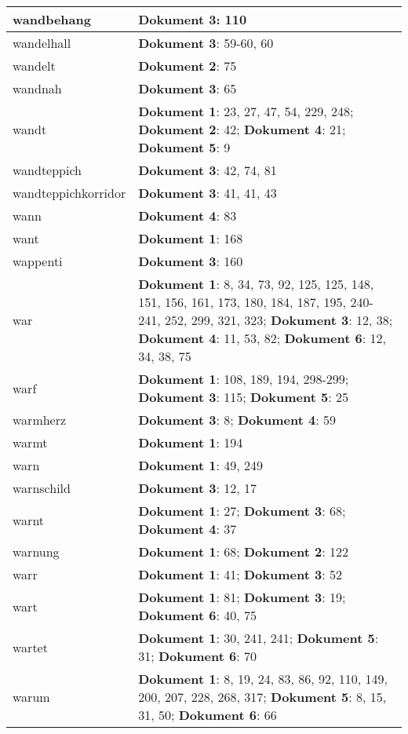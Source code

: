 \documentclass[a5paper]{article}
\begin{document}
\begin{longtable}[l]{|l|p{3in}|}
\hline
wandbehang & \textbf{Dokument 3}: 110 \\
\hline
wandelhall & \textbf{Dokument 3}: 59-60, 60 \\
\hline
wandelt & \textbf{Dokument 2}: 75 \\
\hline
wandnah & \textbf{Dokument 3}: 65 \\
\hline
wandt & \textbf{Dokument 1}: 23, 27, 47, 54, 229, 248; \textbf{Dokument 2}: 42; \textbf{Dokument 4}: 21; \textbf{Dokument 5}: 9 \\
\hline
wandteppich & \textbf{Dokument 3}: 42, 74, 81 \\
\hline
wandteppichkorridor & \textbf{Dokument 3}: 41, 41, 43 \\
\hline
wann & \textbf{Dokument 4}: 83 \\
\hline
want & \textbf{Dokument 1}: 168 \\
\hline
wappenti & \textbf{Dokument 3}: 160 \\
\hline
war & \textbf{Dokument 1}: 8, 34, 73, 92, 125, 125, 148, 151, 156, 161, 173, 180, 184, 187, 195, 240-241, 252, 299, 321, 323; \textbf{Dokument 3}: 12, 38; \textbf{Dokument 4}: 11, 53, 82; \textbf{Dokument 6}: 12, 34, 38, 75 \\
\hline
warf & \textbf{Dokument 1}: 108, 189, 194, 298-299; \textbf{Dokument 3}: 115; \textbf{Dokument 5}: 25 \\
\hline
warmherz & \textbf{Dokument 3}: 8; \textbf{Dokument 4}: 59 \\
\hline
warmt & \textbf{Dokument 1}: 194 \\
\hline
warn & \textbf{Dokument 1}: 49, 249 \\
\hline
warnschild & \textbf{Dokument 3}: 12, 17 \\
\hline
warnt & \textbf{Dokument 1}: 27; \textbf{Dokument 3}: 68; \textbf{Dokument 4}: 37 \\
\hline
warnung & \textbf{Dokument 1}: 68; \textbf{Dokument 2}: 122 \\
\hline
warr & \textbf{Dokument 1}: 41; \textbf{Dokument 3}: 52 \\
\hline
wart & \textbf{Dokument 1}: 81; \textbf{Dokument 3}: 19; \textbf{Dokument 6}: 40, 75 \\
\hline
wartet & \textbf{Dokument 1}: 30, 241, 241; \textbf{Dokument 5}: 31; \textbf{Dokument 6}: 70 \\
\hline
warum & \textbf{Dokument 1}: 8, 19, 24, 83, 86, 92, 110, 149, 200, 207, 228, 268, 317; \textbf{Dokument 5}: 8, 15, 31, 50; \textbf{Dokument 6}: 66 \\
\hline

\end{longtable}
\end{document}
